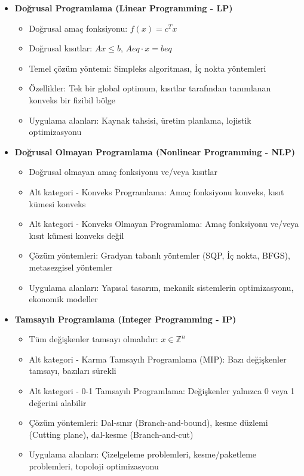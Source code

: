 \begin{itemize}
    \item \textbf{Doğrusal Programlama (Linear Programming - LP)}
        \begin{itemize}
            \item Doğrusal amaç fonksiyonu: $f(x) = c^T x$
            \item Doğrusal kısıtlar: $Ax \leq b$, $Aeq \cdot x = beq$
            \item Temel çözüm yöntemi: Simpleks algoritması, İç nokta yöntemleri
            \item Özellikler: Tek bir global optimum, kısıtlar tarafından tanımlanan konveks bir fizibil bölge
            \item Uygulama alanları: Kaynak tahsisi, üretim planlama, lojistik optimizasyonu
        \end{itemize}
        
    \item \textbf{Doğrusal Olmayan Programlama (Nonlinear Programming - NLP)}
        \begin{itemize}
            \item Doğrusal olmayan amaç fonksiyonu ve/veya kısıtlar
            \item Alt kategori - Konveks Programlama: Amaç fonksiyonu konveks, kısıt kümesi konveks
            \item Alt kategori - Konveks Olmayan Programlama: Amaç fonksiyonu ve/veya kısıt kümesi konveks değil
            \item Çözüm yöntemleri: Gradyan tabanlı yöntemler (SQP, İç nokta, BFGS), metasezgisel yöntemler
            \item Uygulama alanları: Yapısal tasarım, mekanik sistemlerin optimizasyonu, ekonomik modeller
        \end{itemize}
        
    \item \textbf{Tamsayılı Programlama (Integer Programming - IP)}
        \begin{itemize}
            \item Tüm değişkenler tamsayı olmalıdır: $x \in \mathbb{Z}^n$
            \item Alt kategori - Karma Tamsayılı Programlama (MIP): Bazı değişkenler tamsayı, bazıları sürekli
            \item Alt kategori - 0-1 Tamsayılı Programlama: Değişkenler yalnızca 0 veya 1 değerini alabilir
            \item Çözüm yöntemleri: Dal-sınır (Branch-and-bound), kesme düzlemi (Cutting plane), dal-kesme (Branch-and-cut)
            \item Uygulama alanları: Çizelgeleme problemleri, kesme/paketleme problemleri, topoloji optimizasyonu
        \end{itemize}
        

\end{itemize}
